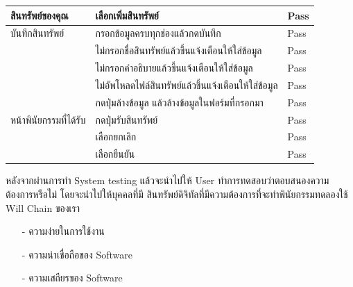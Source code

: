 \documentclass[12pt,oneside,openright,a4paper]{cpe-thai-project}
\begin{document}
\begin{table}[h]
\begin{tabular}{|l|l|l|}
สินทรัพย์ของคุณ        & เลือกเพิ่มสินทรัพย์                              &      Pass  \\ \hline                
บันทึกสินทรัพย์        & กรอกข้อมูลครบทุกช่องแล้วกดบันทึก                      &     Pass   \\ \hline
                       & ไม่กรอกชื่อสินทรัพย์แล้วขึ้นแจ้งเตือนให้ใส่ข้อมูล                                &  Pass      \\ \hline
                       & ไม่กรอกคำอธิบายแล้วขึ้นแจ้งเตือนให้ใส่ข้อมูล                          &    Pass   \\ \hline
                       & ไม่อัพโหลดไฟล์สินทรัพย์แล้วขึ้นแจ้งเตือนให้ใส่ข้อมูล                       & Pass       \\ \hline                    
                        & กดปุ่มล้างข้อมูล แล้วล้างข้อมูลในฟอร์มที่กรอกมา       &Pass        \\ \hline        
หน้าพินัยกรรมที่ได้รับ & กดปุ่มรับสินทรัพย์                              & Pass      \\ \hline
                       & เลือกยกเลิก                           &    Pass    \\ \hline
                       & เลือกยืนยัน                     & Pass       \\ \hline
\end{tabular}
\end{table}
\tab หลังจากผ่านการทำ System testing แล้วจะนำไปให้ User ทำการทดสอบว่าตอบสนองความต้องการหรือไม่ โดยจะนำไปให้บุคคลที่มี สินทรัพย์ดิจิทัลที่มีความต้องการที่จะทำพินัยกรรมทดลองใช้ Will Chain ของเรา

\begin{itemize}
	\item[-] ความง่ายในการใช้งาน
	\item[-]  ความน่าเชื่อถือของ Software
	\item[-]  ความเสถียรของ Software
\end{itemize}
\end{document}
